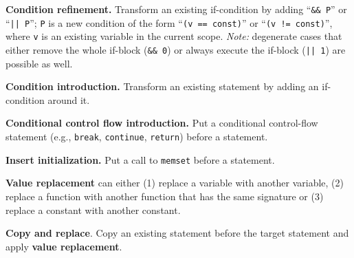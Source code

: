 \textbf{Condition refinement.} Transform an existing if-condition by adding ``\texttt{\&\& P}'' or ``\texttt{|| P}''; \texttt{P} is a new condition of the form ``\texttt{(v == const)}'' or ``\texttt{(v != const)}'', where \texttt{v} is an existing variable in the current scope.
\emph{Note:} degenerate cases that either remove the whole if-block (\texttt{\&\& 0}) or always execute the if-block (\texttt{|| 1}) are possible as well.

\textbf{Condition introduction.} Transform an existing statement by adding an if-condition around it.

\textbf{Conditional control flow introduction.} Put a conditional control-flow statement (e.g., \texttt{break}, \texttt{continue}, \texttt{return}) before a statement.

\textbf{Insert initialization.} Put a call to \texttt{memset} before a statement.

\textbf{Value replacement} can either (1) replace a variable with another variable, (2) replace a function with another function that has the same signature or (3) replace a constant with another constant.

\textbf{Copy and replace}. Copy an existing statement before the target statement and apply \textbf{value replacement}.

